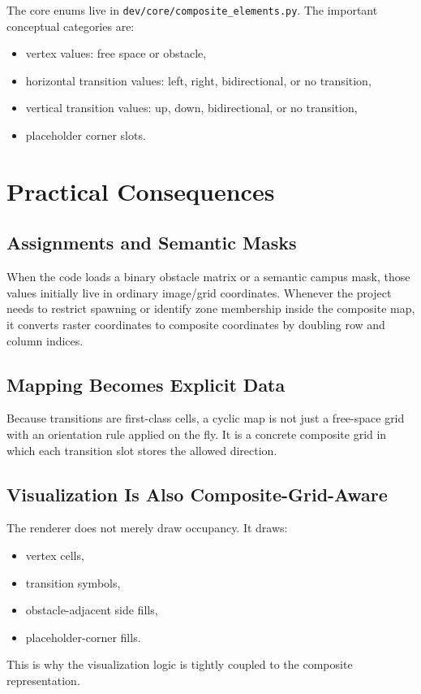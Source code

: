 \documentclass[11pt]{article}
\begin{document}
The core enums live in \texttt{dev/core/composite\_elements.py}. The important conceptual categories are:
\begin{itemize}[leftmargin=2em]
    \item vertex values: free space or obstacle,
    \item horizontal transition values: left, right, bidirectional, or no transition,
    \item vertical transition values: up, down, bidirectional, or no transition,
    \item placeholder corner slots.
\end{itemize}

\section{Practical Consequences}

\subsection{Assignments and Semantic Masks}

When the code loads a binary obstacle matrix or a semantic campus mask, those values initially live in ordinary image/grid coordinates. Whenever the project needs to restrict spawning or identify zone membership inside the composite map, it converts raster coordinates to composite coordinates by doubling row and column indices.

\subsection{Mapping Becomes Explicit Data}

Because transitions are first-class cells, a cyclic map is not just a free-space grid with an orientation rule applied on the fly. It is a concrete composite grid in which each transition slot stores the allowed direction.

\subsection{Visualization Is Also Composite-Grid-Aware}

The renderer does not merely draw occupancy. It draws:
\begin{itemize}[leftmargin=2em]
    \item vertex cells,
    \item transition symbols,
    \item obstacle-adjacent side fills,
    \item placeholder-corner fills.
\end{itemize}
This is why the visualization logic is tightly coupled to the composite representation.
\end{document}
